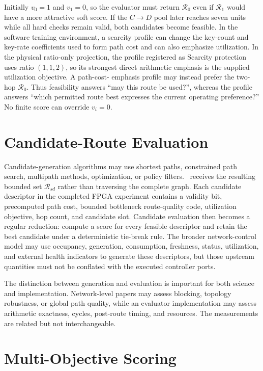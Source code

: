 Initially $v_0=1$ and $v_1=0$, so the evaluator must return $\mathcal R_0$ even if
$\mathcal R_1$ would have a more attractive soft score. If the
$C\!\rightarrow D$ pool later reaches seven units while all hard checks remain
valid, both candidates become feasible. In the software training environment, a
scarcity profile can change the key-count and key-rate coefficients used to form
path cost and can also emphasize utilization. In the physical ratio-only projection,
the profile registered as Scarcity protection uses ratio $(1,1,2)$, so its strongest
direct arithmetic emphasis is the supplied utilization objective. A path-cost-
emphasis profile may instead prefer the two-hop $\mathcal R_0$. Thus feasibility
answers ``may this route be used?'', whereas the profile answers ``which permitted
route best expresses the current operating preference?'' No finite score can
override $v_i=0$.

\section{Candidate-Route Evaluation}

Candidate-generation algorithms may use shortest paths, constrained path search,
multipath methods, optimization, or policy filters. \QFlow\ receives the resulting
bounded set $\mathcal{R}_{sd}$ rather than traversing the complete graph. Each
candidate descriptor in the completed FPGA experiment contains a validity bit,
precomputed path cost, bounded bottleneck route-quality code, utilization objective,
hop count, and candidate slot. Candidate evaluation then becomes a regular
reduction: compute a score for every feasible descriptor and retain the best
candidate under a deterministic tie-break rule. The broader network-control model
may use occupancy, generation, consumption, freshness, status, utilization, and
external health indicators to generate these descriptors, but those upstream
quantities must not be conflated with the executed controller ports.

The distinction between generation and evaluation is important for both science and
implementation. Network-level papers may assess blocking, topology robustness, or
global path quality, while an evaluator implementation may assess arithmetic
exactness, cycles, post-route timing, and resources. The measurements are related
but not interchangeable.

\section{Multi-Objective Scoring}

